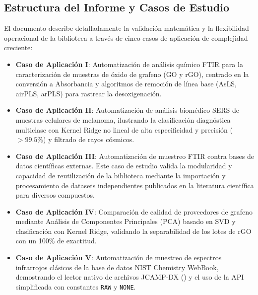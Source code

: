 \subsection{Estructura del Informe y Casos de Estudio}
El documento describe detalladamente la validación matemática y la flexibilidad operacional de la biblioteca a través de cinco casos de aplicación de complejidad creciente:
\begin{itemize}
    \item \textbf{Caso de Aplicación I}: Automatización de análisis químico FTIR para la caracterización de muestras de óxido de grafeno (GO y rGO), centrado en la conversión a Absorbancia y algoritmos de remoción de línea base (AsLS, airPLS, arPLS) para rastrear la desoxigenación.
    \item \textbf{Caso de Aplicación II}: Automatización de análisis biomédico SERS de muestras celulares de melanoma, ilustrando la clasificación diagnóstica multiclase con Kernel Ridge no lineal de alta especificidad y precisión ($>99.5\%$) y filtrado de rayos cósmicos.
    \item \textbf{Caso de Aplicación III}: Automatización de muestreo FTIR contra bases de datos científicas externas. Este caso de estudio valida la modularidad y capacidad de reutilización de la biblioteca mediante la importación y procesamiento de datasets independientes publicados en la literatura científica para diversos compuestos.
    \item \textbf{Caso de Aplicación IV}: Comparación de calidad de proveedores de grafeno mediante Análisis de Componentes Principales (PCA) basado en SVD y clasificación con Kernel Ridge, validando la separabilidad de los lotes de rGO con un 100\% de exactitud.
    \item \textbf{Caso de Aplicación V}: Automatización de muestreo de espectros infrarrojos clásicos de la base de datos NIST Chemistry WebBook, demostrando el lector nativo de archivos JCAMP-DX () y el uso de la API simplificada con constantes \texttt{RAW} y \texttt{NONE}.
\end{itemize}
\newpage